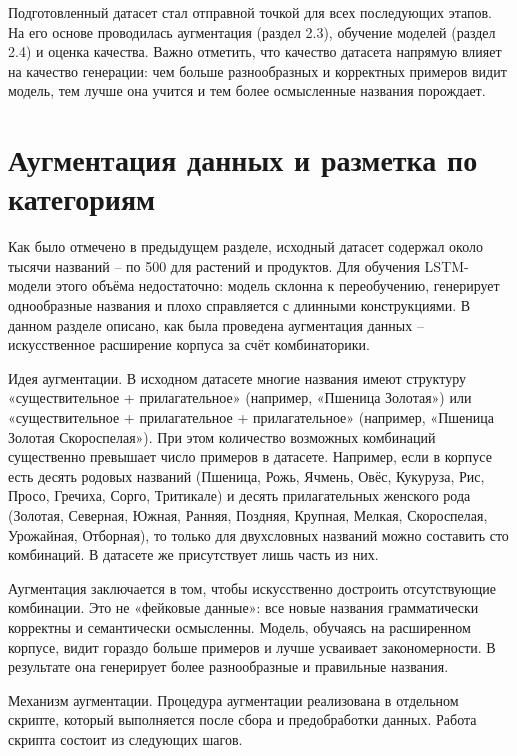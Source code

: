 Подготовленный датасет стал отправной точкой для всех последующих этапов. На его основе проводилась аугментация (раздел 2.3), обучение моделей (раздел 2.4) и оценка качества. Важно отметить, что качество датасета напрямую влияет на качество генерации: чем больше разнообразных и корректных примеров видит модель, тем лучше она учится и тем более осмысленные названия порождает.

\section{Аугментация данных и разметка по категориям}\label{ux430ux443ux433ux43cux435ux43dux442ux430ux446ux438ux44f-ux434ux430ux43dux43dux44bux445-ux438-ux440ux430ux437ux43cux435ux442ux43aux430-ux43fux43e-ux43aux430ux442ux435ux433ux43eux440ux438ux44fux43c}

Как было отмечено в предыдущем разделе, исходный датасет содержал около тысячи названий -- по 500 для растений и продуктов. Для обучения LSTM-модели этого объёма недостаточно: модель склонна к переобучению, генерирует однообразные названия и плохо справляется с длинными конструкциями. В данном разделе описано, как была проведена аугментация данных -- искусственное расширение корпуса за счёт комбинаторики.

Идея аугментации. В исходном датасете многие названия имеют структуру «существительное + прилагательное» (например, «Пшеница Золотая») или «существительное + прилагательное + прилагательное» (например, «Пшеница Золотая Скороспелая»). При этом количество возможных комбинаций существенно превышает число примеров в датасете. Например, если в корпусе есть десять родовых названий (Пшеница, Рожь, Ячмень, Овёс, Кукуруза, Рис, Просо, Гречиха, Сорго, Тритикале) и десять прилагательных женского рода (Золотая, Северная, Южная, Ранняя, Поздняя, Крупная, Мелкая, Скороспелая, Урожайная, Отборная), то только для двухсловных названий можно составить сто комбинаций. В датасете же присутствует лишь часть из них.

Аугментация заключается в том, чтобы искусственно достроить отсутствующие комбинации. Это не «фейковые данные»: все новые названия грамматически корректны и семантически осмысленны. Модель, обучаясь на расширенном корпусе, видит гораздо больше примеров и лучше усваивает закономерности. В результате она генерирует более разнообразные и правильные названия.

Механизм аугментации. Процедура аугментации реализована в отдельном скрипте, который выполняется после сбора и предобработки данных. Работа скрипта состоит из следующих шагов.

